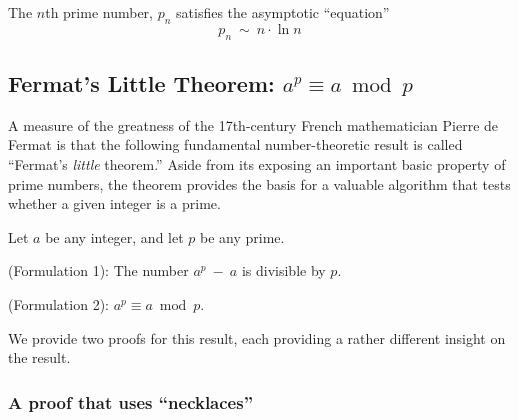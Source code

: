 \begin{theorem}
\label{thm:prime-number-theorem}
The $n$th prime number, $p_n$ satisfies the asymptotic ``equation'' 
\[ p_{n} \  \sim  \ n \cdot \ln n \]
\end{theorem}
  

\subsection{Fermat's Little Theorem: $a^{p} \equiv a \bmod p$}
\label{sec:fermat}

A measure of the greatness of the 17th-century French mathematician Pierre de Fermat is that the following fundamental number-theoretic result is called ``Fermat's {\em little} theorem.''  Aside from its exposing an important basic property of prime numbers, the theorem provides the basis for a valuable algorithm that tests whether a given integer is a prime.

\begin{theorem}
\label{thm:Fermat's-Little-Thm}
Let $a$ be any integer, and let $p$ be any prime.

{\rm (Formulation 1):}
The number $a^p \ - \ a$ is divisible by $p$.

\medskip

{\rm (Formulation 2):}
$a^{p} \equiv a \bmod p$.
\end{theorem}

\smallskip

\noindent
We provide two proofs for this result, each providing a rather different insight on the result.

\subsubsection{A proof that uses ``necklaces''}
\label{sec:FTL-necklaces}

